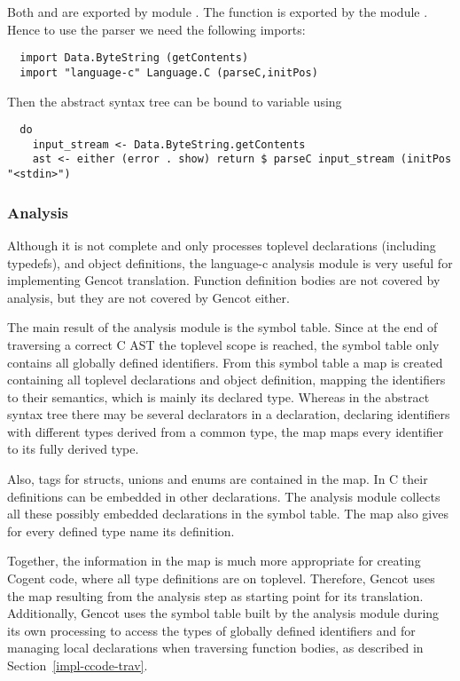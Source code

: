 Both  and  are exported by module . The function 
is exported by the module . Hence to use the parser we need the following imports:
\begin{verbatim}
  import Data.ByteString (getContents)
  import "language-c" Language.C (parseC,initPos)
\end{verbatim}

Then the abstract syntax tree can be bound to variable  using
\begin{verbatim}
  do
    input_stream <- Data.ByteString.getContents
    ast <- either (error . show) return $ parseC input_stream (initPos "<stdin>")
\end{verbatim}

\subsubsection{Analysis}

Although it is not complete and only processes toplevel declarations (including typedefs), and object definitions, the
language-c analysis module is very
useful for implementing Gencot translation. Function definition bodies are not covered by analysis, but they are
not covered by Gencot either.

The main result of the analysis module is the symbol table. Since at the end of traversing a correct C AST the toplevel
scope is reached, the symbol table only contains all globally defined identifiers. From this symbol table 
a map is created containing all toplevel declarations and object definition, mapping the identifiers
to their semantics, which is mainly its declared type. Whereas in the abstract syntax tree there may be several declarators
in a declaration, declaring identifiers with different types derived from a common type, the map maps every identifier
to its fully derived type. 

Also, tags for structs, unions and enums are contained in the map. In C their definitions can be embedded in other declarations.
The analysis module collects all these possibly embedded declarations in the symbol table. The map also gives for
every defined type name its definition.

Together, the information in the map is much more appropriate for creating Cogent code, where all type definitions are on
toplevel. Therefore, Gencot uses the map resulting from the analysis step as starting point for its translation. 
Additionally, Gencot uses the symbol table built by the analysis module during its own processing to access the
types of globally defined identifiers and for managing local declarations when traversing function bodies, as described in
Section~\ref{impl-ccode-trav}.

